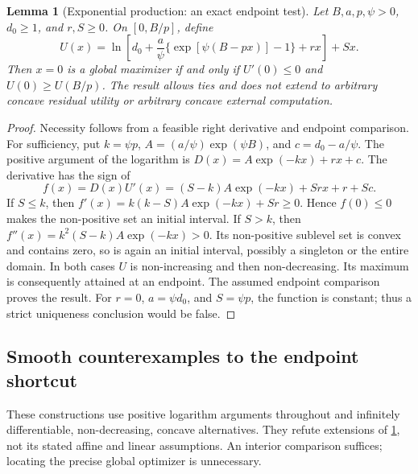 \documentclass[11pt,a4paper]{article}
\newtheorem{lemma}[proposition]{Lemma}
\theoremstyle{definition}\newtheorem{definition}{Definition}
\begin{document}
\begin{lemma}[Exponential production: an exact endpoint test]
\label{lem:exponential-endpoints}
Let $B,a,p,\psi>0$, $d_0\geq1$, and $r,S\geq0$. On $[0,B/p]$,
define
\begin{equation}
 U(x)=\ln\!\left[d_0+\frac a\psi
   \{\exp[\psi(B-px)]-1\}+rx\right]+Sx.
 \label{eq:exponential-objective}
\end{equation}
Then $x=0$ is a global maximizer if and only if
$U'(0)\leq0$ and $U(0)\geq U(B/p)$.
The result allows ties and does not extend to arbitrary concave
residual utility or arbitrary concave external computation.
\end{lemma}
\begin{proof}
Necessity follows from a feasible right derivative and endpoint
comparison. For sufficiency, put $k=\psi p$,
$A=(a/\psi)\exp(\psi B)$, and $c=d_0-a/\psi$. The positive
argument of the logarithm is $D(x)=A\exp(-kx)+rx+c$.
The derivative has the sign of
\[
 f(x)=D(x)U'(x)=(S-k)A\exp(-kx)+Sr x+r+Sc.
\]
If $S\leq k$, then
$f'(x)=k(k-S)A\exp(-kx)+Sr\geq0$. Hence $f(0)\leq0$ makes
the non-positive set an initial interval. If $S>k$, then
$f''(x)=k^2(S-k)A\exp(-kx)>0$. Its non-positive sublevel set
is convex and contains zero, so is again an initial interval, possibly
a singleton or the entire domain. In both cases $U$ is non-increasing
and then non-decreasing. Its maximum is consequently attained at an
endpoint. The assumed endpoint comparison proves the result.
For $r=0$, $a=\psi d_0$, and $S=\psi p$, the function is constant;
thus a strict uniqueness conclusion would be false.
\end{proof}

\subsection{Smooth counterexamples to the endpoint shortcut}
\label{app:exponential-counterexamples}
These constructions use positive logarithm arguments throughout and
infinitely differentiable, non-decreasing, concave alternatives.
They refute extensions of \cref{lem:exponential-endpoints}, not its
stated affine and linear assumptions. An interior comparison suffices;
locating the precise global optimizer is unnecessary.
\end{document}

